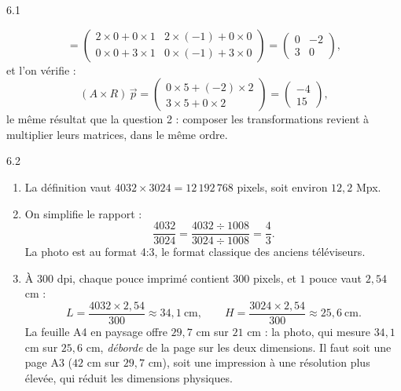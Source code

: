 \begin{corrige}{6.1}
\begin{enumerate}
\[= \begin{pmatrix} 2 \times 0 + 0 \times 1 & 2 \times (-1) + 0 \times 0 \\ 0 \times 0 + 3 \times 1 & 0 \times (-1) + 3 \times 0 \end{pmatrix}
= \begin{pmatrix} 0 & -2 \\ 3 & 0 \end{pmatrix},
\]
et l'on vérifie :
\[
(A \times R)\,\vec{p} = \begin{pmatrix} 0 \times 5 + (-2) \times 2 \\ 3 \times 5 + 0 \times 2 \end{pmatrix} = \begin{pmatrix} -4 \\ 15 \end{pmatrix},
\]
le même résultat que la question 2 : composer les transformations revient à multiplier leurs matrices, dans le même ordre.
\end{enumerate}
\end{corrige}

\begin{corrige}{6.2}
\begin{enumerate}
\item La définition vaut $4032 \times 3024 = 12\,192\,768$ pixels, soit environ $12{,}2$ Mpx.
\item On simplifie le rapport :
\[
\frac{4032}{3024} = \frac{4032 \div 1008}{3024 \div 1008} = \frac{4}{3} .
\]
La photo est au format 4:3, le format classique des anciens téléviseurs.
\item À $300$ dpi, chaque pouce imprimé contient $300$ pixels, et $1$ pouce vaut $2{,}54$ cm :
\[
L = \frac{4032 \times 2{,}54}{300} \approx 34{,}1 \ \text{cm},
\qquad
H = \frac{3024 \times 2{,}54}{300} \approx 25{,}6 \ \text{cm} .
\]
La feuille A4 en paysage offre $29{,}7$ cm sur $21$ cm : la photo, qui mesure $34{,}1$ cm sur $25{,}6$ cm, \emph{déborde} de la page sur les deux dimensions. Il faut soit une page A3 ($42$ cm sur $29{,}7$ cm), soit une impression à une résolution plus élevée, qui réduit les dimensions physiques.
\end{enumerate}
\end{corrige}

